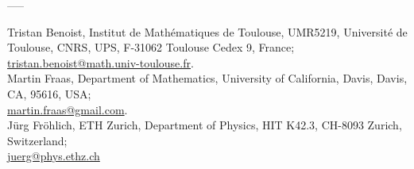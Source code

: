 \documentclass[12pt]{article}
\begin{document}
\begin{center}
-----
\end{center}


\bigskip


\noindent
Tristan Benoist, Institut de Math\'ematiques de Toulouse, UMR5219, Universit\'e de Toulouse, CNRS, UPS, F-31062 Toulouse Cedex 9, France;\\ \href{mailto:tristan.benoist@math.univ-toulouse.fr}{tristan.benoist@math.univ-toulouse.fr}.
\\[0.3em]
Martin Fraas, Department of Mathematics, University of California, Davis, Davis, CA, 95616, USA;\\ \href{mailto:martin.fraas@gmail.com}{martin.fraas@gmail.com}.
\\[0.3em]
J\"urg Fr\"ohlich, ETH Zurich, Department of Physics, HIT K42.3, CH-8093 Zurich, Switzerland;\\\href{mailto:juerg@phys.ethz.ch}{juerg@phys.ethz.ch}
\end{document}
